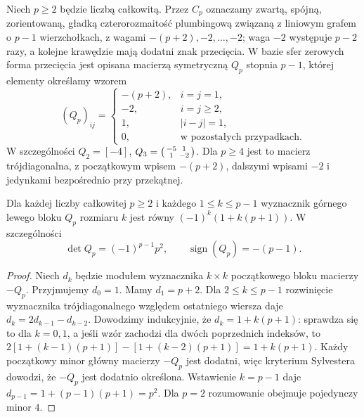 \begin{definicja}
Niech $p\geq2$ będzie liczbą całkowitą.
Przez $C_p$ oznaczamy zwartą, spójną, zorientowaną,
gładką czterorozmaitość plumbingową związaną z liniowym
grafem o $p-1$ wierzchołkach, z wagami
$-(p+2),-2,\ldots,-2$; waga $-2$ występuje
$p-2$ razy, a kolejne krawędzie mają dodatni znak
przecięcia. W bazie sfer zerowych forma przecięcia jest opisana
macierzą symetryczną $Q_p$ stopnia $p-1$, której elementy
określamy wzorem
\[
(Q_p)_{ij}=\begin{cases}
-(p+2),&i=j=1,\\
-2,&i=j\geq2,\\
1,&|i-j|=1,\\
0,&\text{w pozostałych przypadkach}.
\end{cases}
\]
W szczególności $Q_2=[-4]$,
$Q_3=\begin{psmallmatrix}-5&1\\1&-2\end{psmallmatrix}$.
Dla $p\geq4$ jest to macierz trójdiagonalna,
z początkowym wpisem $-(p+2)$, dalszymi wpisami
$-2$ i jedynkami bezpośrednio przy przekątnej.
\end{definicja}

\begin{center}
\end{center}

\begin{lemat}
\label{lem:tg-rb-minors}
Dla każdej liczby całkowitej $p\geq2$ i każdego
$1\leq k\leq p-1$ wyznacznik górnego lewego bloku
$Q_p$ rozmiaru $k$ jest równy
$(-1)^k(1+k(p+1))$. W szczególności
\[
\det Q_p=(-1)^{p-1}p^2,
\qquad \operatorname{sign}(Q_p)=-(p-1).
\]
\end{lemat}

\begin{proof}
Niech $d_k$ będzie modułem wyznacznika $k\times k$
początkowego bloku macierzy $-Q_p$.
Przyjmujemy $d_0=1$. Mamy $d_1=p+2$.
Dla $2\leq k\leq p-1$ rozwinięcie wyznacznika
trójdiagonalnego względem ostatniego wiersza daje
$d_k=2d_{k-1}-d_{k-2}$. Dowodzimy indukcyjnie,
że $d_k=1+k(p+1)$: sprawdza się to dla $k=0,1$,
a jeśli wzór zachodzi dla dwóch poprzednich indeksów,
to $2[1+(k-1)(p+1)]-[1+(k-2)(p+1)]
=1+k(p+1)$.
Każdy początkowy minor główny macierzy $-Q_p$
jest dodatni, więc kryterium Sylvestera dowodzi,
że $-Q_p$ jest dodatnio określona. Wstawienie
$k=p-1$ daje $d_{p-1}=1+(p-1)(p+1)=p^2$.
Dla $p=2$ rozumowanie obejmuje pojedynczy minor $4$.
\end{proof}

